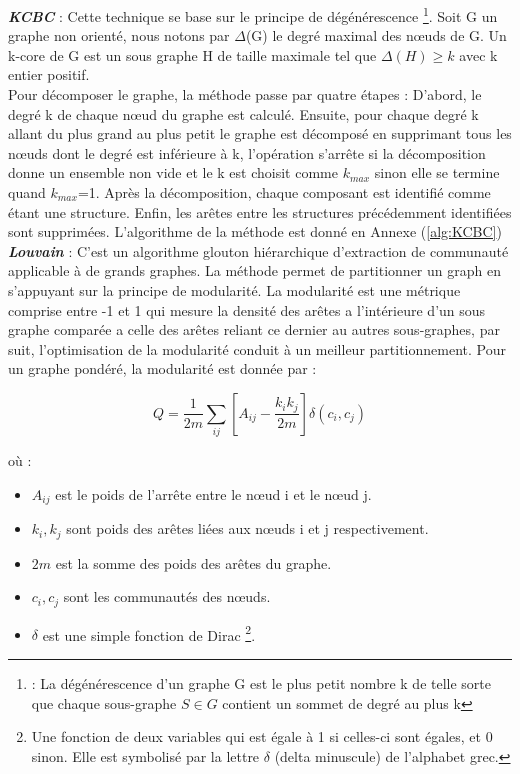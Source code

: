 \documentclass[a4paper,oneside,12pt]{report}
\theoremstyle{definition}
\begin{document}
\begin{enumerate}
\textbf{\textit{KCBC}} : Cette technique se base sur le principe de dégénérescence \footnote{: La dégénérescence d’un graphe G est le plus petit nombre k de
 telle sorte que chaque sous-graphe $S \in G$ contient un sommet de degré au plus k}. Soit G un graphe non orienté, nous notons par $\Delta$(G) le degré maximal des nœuds de G. Un k-core de G est un sous graphe H de taille maximale tel que $\Delta(H) \ge k$ avec k entier positif.\\
Pour décomposer le graphe, la méthode passe par quatre étapes : D'abord, le degré k de chaque nœud du graphe est calculé. Ensuite, pour chaque degré k allant du plus grand au plus petit le graphe est décomposé en supprimant tous les nœuds dont le degré est inférieure à k, l'opération s'arrête si la décomposition donne un ensemble non vide et le k est choisit comme $k_{max}$ sinon elle se termine quand $k_{max}$=1. Après la décomposition, chaque composant est identifié comme étant une structure. Enfin, les arêtes entre les structures précédemment identifiées sont supprimées. L'algorithme de la méthode est donné en Annexe (\ref{alg:KCBC})\\


\textbf{\textit{Louvain}} : C'est un algorithme glouton hiérarchique d'extraction de communauté applicable à de grands graphes. La méthode permet de partitionner un graph en s'appuyant sur la principe de modularité. La modularité est une métrique comprise entre -1 et 1 qui mesure la densité des arêtes a l'intérieure d'un sous graphe comparée a celle des arêtes reliant ce dernier au autres sous-graphes, par suit, l'optimisation de la modularité conduit à un meilleur partitionnement. Pour un graphe pondéré, la modularité est donnée par :    

\begin{equation} \label{eq:lovain}
\textit{Q} = \frac{1}{2m} \sum_{ij}[A_{ij} - \frac{{k}_{i}{k}_{j}}{2m}]  \delta({c}_{i},{c}_{j})
\end{equation}

où :
\begin{itemize}
\item $A_{ij}$ est le poids de l'arrête entre le nœud i et le nœud j.
\item ${k}_{i},{k}_{j}$ sont poids des arêtes liées aux nœuds  i et  j respectivement.
\item $2m$ est la somme des poids des arêtes du graphe. 
\item ${c}_{i}, {c}_{j}$ sont les communautés des nœuds.
\item $\delta$ est une simple fonction de Dirac \footnote{Une fonction de deux variables qui est égale à 1 si celles-ci sont égales, et 0 sinon. Elle est symbolisé par la lettre $\delta$ (delta minuscule) de l'alphabet grec.}.
\end{itemize}


\end{enumerate}
\end{document}
